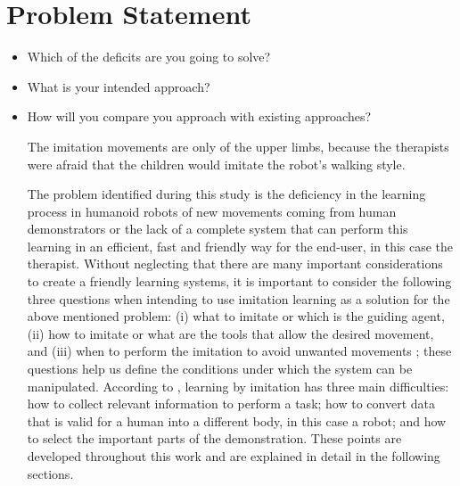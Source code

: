 \documentclass[thesis]{mas_proposal}
\begin{document}
\section{Problem Statement}
\begin{itemize}
    \item Which of the deficits are you going to solve?
    \item What is your intended approach?
    \item How will you compare you approach with existing approaches?
    
    The imitation movements are only of the upper limbs, because the therapists were afraid that the children would imitate the robot's walking style.
    
     The problem identified during this study is the deficiency in the learning process in humanoid robots of new movements coming from human demonstrators or the lack of a complete system that can perform this learning in an efficient, fast and friendly way for the end-user, in this case the therapist. Without neglecting that there are many important considerations to create a friendly learning systems, it is important to consider the following three questions when intending to use imitation learning as a solution for the above mentioned problem: (i) what to imitate or which is the guiding agent, (ii) how to imitate or what are the tools that allow the desired movement, and (iii) when to perform the imitation to avoid unwanted movements \cite{Billard_2004}; these questions help us define the conditions under which the system can be manipulated. According to \cite{lopes2005developmental}, learning by imitation has three main difficulties: how to collect relevant information to perform a task; how to convert data that is valid for a human into a different body, in this case a robot; and how to select the important parts of the demonstration. These points are developed throughout this work and are explained in detail in the following sections.
    

\end{itemize}
\end{document}
